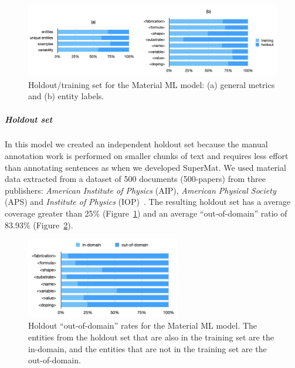 \begin{figure}[ht]
    \centering
    \includegraphics[width=\textwidth]{figures/automatic_extraction_supercon/material-holdout-training-set}
    \caption{Holdout/training set for the Material ML model: (a) general metrics and (b) entity labels.}
    \label{fig:material-training-holdout-set-distribution}
\end{figure}

\subparagraph*{Holdout set}
In this model we created an independent holdout set because the manual annotation work is performed on smaller chunks of text and requires less effort than annotating sentences as when we developed SuperMat.
We used material data extracted from a dataset of 500 documents (500-papers) from three publishers: \textit{American Institute of Physics} (AIP), \textit{American Physical Society} (APS) and \textit{Institute of Physics} (IOP)~\cite{foppiano2019proposal}.
The resulting holdout set has a average coverage greater than 25\% (Figure~\ref{fig:material-training-holdout-set-distribution}) and an average ``out-of-domain'' ratio of 83.93\% (Figure~\ref{fig:material-out-domain-holdout}).

\begin{figure}[ht]
    \centering
    \includegraphics[width=0.6\textwidth]{figures/automatic_extraction_supercon/material-out-domain-holdout-unique}
    \caption{Holdout ``out-of-domain'' rates for the Material ML model. The entities from the holdout set that are also in the training set are the in-domain, and the entities that are not in the training set are the out-of-domain.}
    \label{fig:material-out-domain-holdout}
\end{figure}

